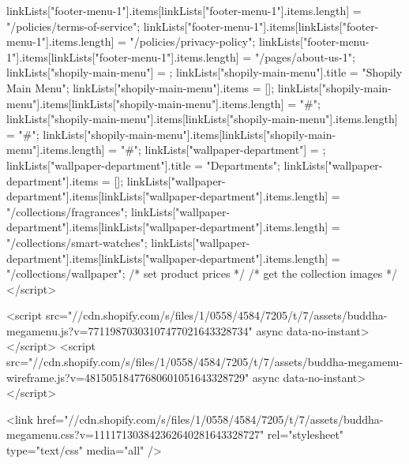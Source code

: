 {{{{{linkLists["footer-menu-1"].items[linkLists["footer-menu-1"].items.length] = "/policies/terms-of-service";  linkLists["footer-menu-1"].items[linkLists["footer-menu-1"].items.length] = "/policies/privacy-policy";  linkLists["footer-menu-1"].items[linkLists["footer-menu-1"].items.length] = "/pages/about-us-1";             linkLists["shopily-main-menu"] = {}; linkLists["shopily-main-menu"].title = "Shopily Main Menu"; linkLists["shopily-main-menu"].items = [];  linkLists["shopily-main-menu"].items[linkLists["shopily-main-menu"].items.length] = "#";  linkLists["shopily-main-menu"].items[linkLists["shopily-main-menu"].items.length] = "#";  linkLists["shopily-main-menu"].items[linkLists["shopily-main-menu"].items.length] = "#";           linkLists["wallpaper-department"] = {}; linkLists["wallpaper-department"].title = "Departments"; linkLists["wallpaper-department"].items = [];  linkLists["wallpaper-department"].items[linkLists["wallpaper-department"].items.length] = "/collections/fragrances";  linkLists["wallpaper-department"].items[linkLists["wallpaper-department"].items.length] = "/collections/smart-watches";  linkLists["wallpaper-department"].items[linkLists["wallpaper-department"].items.length] = "/collections/wallpaper";            /* set product prices */                                                                                                                                                                                                                                                                                                                                                                                                                                                                                                                                                                                                                              /* get the collection images */ </script>

<script src="//cdn.shopify.com/s/files/1/0558/4584/7205/t/7/assets/buddha-megamenu.js?v=77119870303107477021643328734" async data-no-instant></script>
<script src="//cdn.shopify.com/s/files/1/0558/4584/7205/t/7/assets/buddha-megamenu-wireframe.js?v=48150518477680601051643328729" async data-no-instant></script>

<link href="//cdn.shopify.com/s/files/1/0558/4584/7205/t/7/assets/buddha-megamenu.css?v=111171303842362640281643328727" rel="stylesheet" type="text/css" media="all" />

}}}}}
